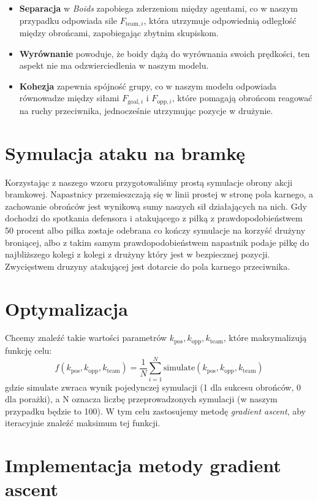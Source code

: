 \documentclass{article}
\begin{document}
\begin{itemize}
    \item \textbf{Separacja} w \textit{Boids} zapobiega zderzeniom między agentami, co w naszym przypadku odpowiada sile \( F_{\text{team}, i} \), która utrzymuje odpowiednią odległość między obrońcami, zapobiegając zbytnim skupiskom.  
    \item \textbf{Wyrównanie} powoduje, że boidy dążą do wyrównania swoich prędkości, ten aspekt nie ma odzwierciedlenia w naszym modelu.  
    \item \textbf{Kohezja} zapewnia spójność grupy, co w naszym modelu odpowiada równowadze między siłami \( F_{\text{goal}, i} \) i \( F_{\text{opp}, i} \), które pomagają obrońcom reagować na ruchy przeciwnika, jednocześnie utrzymując pozycje w drużynie.
\end{itemize}

\section*{Symulacja ataku na bramkę}
Korzystając z naszego wzoru przygotowaliśmy prostą symulacje obrony akcji bramkowej. Napastnicy przemieszczają się w linii prostej w stronę pola karnego, a zachowanie obrońców jest wynikową sumy naszych sił działających na nich. Gdy dochodzi do spotkania defensora i atakującego z piłką z prawdopodobieństwem 50 procent albo piłka zostaje odebrana co kończy symulacje na korzyść drużyny broniącej, albo z takim samym prawdopodobieństwem napastnik podaje piłkę do najbliższego kolegi z kolegi z drużyny który jest w bezpiecznej pozycji. Zwycięstwem druzyny atakującej jest dotarcie do pola karnego przeciwnika.

\section*{Optymalizacja}

Chcemy znaleźć takie wartości parametrów \(k_{\text{pos}}, k_{\text{opp}}, k_{\text{team}}\), które maksymalizują funkcję celu:
\[
f(k_{\text{pos}}, k_{\text{opp}}, k_{\text{team}}) = \frac{1}{N} \sum_{i=1}^N \text{simulate}(k_{\text{pos}}, k_{\text{opp}}, k_{\text{team}})
\]
gdzie \(\text{simulate}\) zwraca wynik pojedynczej symulacji (1 dla sukcesu obrońców, 0 dla porażki), a N oznacza liczbę przeprowadzonych symulacji (w naszym przypadku będzie to 100). W tym celu zastosujemy metodę \textit{gradient ascent}, aby iteracyjnie znaleźć maksimum tej funkcji.

\section*{Implementacja metody gradient ascent}
\end{document}
